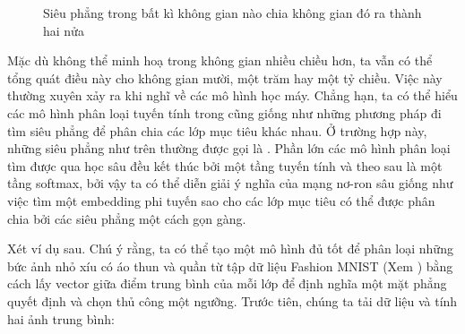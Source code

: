 \documentclass[letterpaper,11pt,english]{sphinxmanual}
\begin{document}
\begin{figure}[H]
\centering
\capstart

\noindent{}
\caption{Siêu phẳng trong bất kì không gian nào chia không gian đó ra thành
hai nửa}\label{\detokenize{chapter_appendix_math/geometry-linear-algebric-ops_vn:id9}}\label{\detokenize{chapter_appendix_math/geometry-linear-algebric-ops_vn:fig-higher-division}}\end{figure}



Mặc dù không thể minh hoạ trong không gian nhiều chiều hơn, ta vẫn có
thể tổng quát điều này cho không gian mười, một trăm hay một tỷ chiều.
Việc này thường xuyên xảy ra khi nghĩ về các mô hình học máy. Chẳng hạn,
ta có thể hiểu các mô hình phân loại tuyến tính trong
 cũng giống như những phương pháp đi tìm siêu
phẳng để phân chia các lớp mục tiêu khác nhau. Ở trường hợp này, những
siêu phẳng như trên thường được gọi là . Phần lớn
các mô hình phân loại tìm được qua học sâu đều kết thúc bởi một tầng
tuyến tính và theo sau là một tầng softmax, bởi vậy ta có thể diễn giải
ý nghĩa của mạng nơ-ron sâu giống như việc tìm một embedding phi tuyến
sao cho các lớp mục tiêu có thể được phân chia bởi các siêu phẳng một
cách gọn gàng.



Xét ví dụ sau. Chú ý rằng, ta có thể tạo một mô hình đủ tốt để phân loại
những bức ảnh nhỏ xíu có áo thun và quần từ tập dữ liệu Fashion MNIST
(Xem ) bằng cách lấy vector giữa điểm trung
bình của mỗi lớp để định nghĩa một mặt phẳng quyết định và chọn thủ công
một ngưỡng. Trước tiên, chúng ta tải dữ liệu và tính hai ảnh trung bình:
\end{document}

